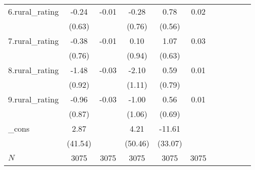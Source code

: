 {\begin{tabular}{l*{5}{cc}}
6.rural\_rating&       -0.24         &       -0.01&       -0.28         &        0.78         &        0.02\\
            &      (0.63)         &            &      (0.76)         &      (0.56)         &            \\
7.rural\_rating&       -0.38         &       -0.01&        0.10         &        1.07         &        0.03\\
            &      (0.76)         &            &      (0.94)         &      (0.63)         &            \\
8.rural\_rating&       -1.48         &       -0.03&       -2.10         &        0.59         &        0.01\\
            &      (0.92)         &            &      (1.11)         &      (0.79)         &            \\
9.rural\_rating&       -0.96         &       -0.03&       -1.00         &        0.56         &        0.01\\
            &      (0.87)         &            &      (1.06)         &      (0.69)         &            \\
\_cons      &        2.87         &            &        4.21         &      -11.61         &            \\
            &     (41.54)         &            &     (50.46)         &     (33.07)         &            \\
\hline
\(N\)       &        3075         &        3075&        3075         &        3075         &        3075\\
\hline\hline
\end{tabular}
}
